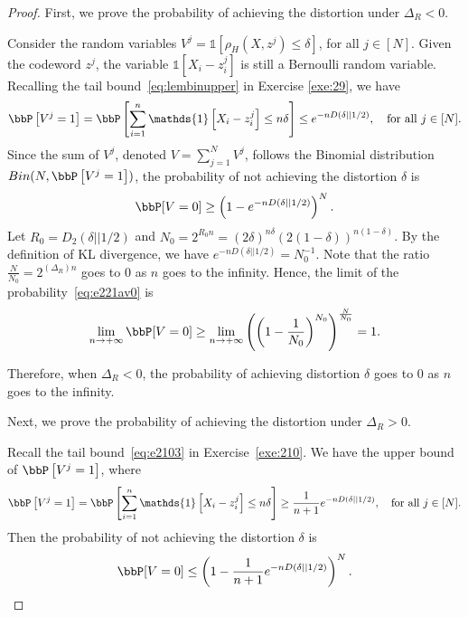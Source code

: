 \documentclass[11pt]{article}
\newcommand{\of}[1]{\left(#1\right)}
\newcommand{\off}[1]{\left[#1\right]}
\theoremstyle{plain}
\theoremstyle{definition}
\begin{document}
 \begin{proof} First, we prove the probability of achieving the distortion under $\Delta_R < 0$.
 
 \vspace{0.2cm}
 
 	Consider the random variables $V^j = \mathds{1}\off{\rho_H(X,z^j) \leq \delta}  $, for all $j \in [N]$. Given the codeword $z^j$, the variable $\mathds{1} \off{X_i - z^j_i}$ is still a Bernoulli random variable. Recalling the tail bound~\eqref{eq:lembinupper} in Exercise \ref{exe:29}, we have
 	\begin{equation}
 		\bbP \off{V^j = 1} = \bbP \off{\sum_{i=1}^n \mathds{1} \off{X_i - z^j_i} \leq n\delta} \leq e^{-nD(\delta || 1/2)}, \quad \text{for all }j\in [N].
 	\end{equation}
 	Since the sum of $V^j$, denoted $V = \sum_{j=1}^N V^j$, follows the Binomial distribution $Bin(N, \bbP \off{V^j = 1} )$, the probability of not achieving the distortion $\delta$ is
 	\begin{equation}\label{eq:e221av0}
 		\bbP[V = 0] \geq \of{1 - e^{-nD(\delta || 1/2)}}^N.
 	\end{equation}
  Let $R_0 = D_2(\delta || 1/2)$ and $N_0 = 2^{R_0 n} = (2\delta)^{n\delta}(2(1-\delta))^{n(1-\delta)}$. By the definition of KL divergence, we have $e^{-nD(\delta || 1/2)} = N^{-1}_0$. Note that the ratio $\frac{N}{N_0} = 2^{(\Delta_R)n}$ goes to 0 as $n$ goes to the infinity. Hence, the limit of the probability~\eqref{eq:e221av0} is
  \begin{equation}
  	\lim_{n \rightarrow +\infty} \bbP[V = 0] \geq \lim_{n \rightarrow +\infty} \of{\of{1 - \frac{1}{N_0}}^{N_0} }^{\frac{N}{N_0}} = 1.
  \end{equation}
  
  Therefore, when $\Delta_R < 0$, the probability of achieving distortion $\delta$ goes to 0 as $n$ goes to the infinity.
 	
 	
 	\vspace{0.2cm}
 	Next,  we prove the probability of achieving the distortion under $\Delta_R > 0$. 
 	
 	\vspace{0.2cm}
 	Recall the tail bound~\eqref{eq:e2103} in Exercise~\ref{exe:210}. We have the upper bound of $\bbP \off{V^j = 1}$, where
 	\begin{equation}\label{eq:e221prob}
 		\bbP \off{V^j = 1} = \bbP \off{\sum_{i=1}^n \mathds{1} \off{X_i - z^j_i} \leq n\delta} \geq \frac{1}{n+1}e^{-nD(\delta || 1/2)}, \quad \text{for all }j\in [N].
 	\end{equation}
 	Then the probability of not achieving the distortion $\delta$ is
 	\begin{equation}
 		\bbP[V = 0] \leq \of{1 - \frac{1}{n+1} e^{-nD(\delta || 1/2)}}^N.
 	\end{equation}
 	

\end{proof}
\end{document}
